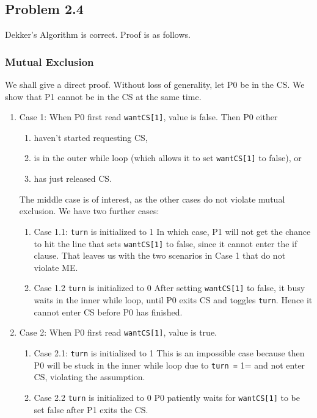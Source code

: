 \documentclass[11pt]{article}
\begin{document}
\subsection{Problem 2.4}
\label{sec:orgdbaf8d9}
Dekker's Algorithm is correct. Proof is as follows.
\subsubsection{Mutual Exclusion}
\label{sec:orge1626ef}
We shall give a direct proof. Without loss of generality, let P0 be in the CS.
We show that P1 cannot be in the CS at the same time.
\begin{enumerate}
\item Case 1: When P0 first read \texttt{wantCS[1]}, value is false.
\label{sec:orge89c9e7}
Then P0 either
\begin{enumerate}
\item haven't started requesting CS,
\item is in the outer while loop (which allows it to set \texttt{wantCS[1]} to false), or
\item has just released CS.
\end{enumerate}

The middle case is of interest, as the other cases do not violate mutual
exclusion. We have two further cases:
\begin{enumerate}
\item Case 1.1: \texttt{turn} is initialized to 1
\label{sec:orgbae90b7}
In which case, P1 will not get the chance to hit the line that sets \texttt{wantCS[1]}
to false, since it cannot enter the if clause. That leaves us with the two
scenarios in Case 1 that do not violate ME.
\item Case 1.2 \texttt{turn} is initialized to 0
\label{sec:orge9d7291}
After setting \texttt{wantCS[1]} to false, it busy waits in the inner while loop, until
P0 exits CS and toggles \texttt{turn}. Hence it cannot enter CS before P0 has finished.
\end{enumerate}
\item Case 2: When P0 first read \texttt{wantCS[1]}, value is true.
\label{sec:orgdda7bb4}
\begin{enumerate}
\item Case 2.1: \texttt{turn} is initialized to 1
\label{sec:org68a4748}
This is an impossible case because then P0 will be stuck in the inner while loop
due to \texttt{turn =} 1= and not enter CS, violating the assumption.
\item Case 2.2 \texttt{turn} is initialized to 0
\label{sec:orgcb05cb7}
P0 patiently waits for \texttt{wantCS[1]} to be set false after P1 exits the CS.
\end{enumerate}
\end{enumerate}
\end{document}

